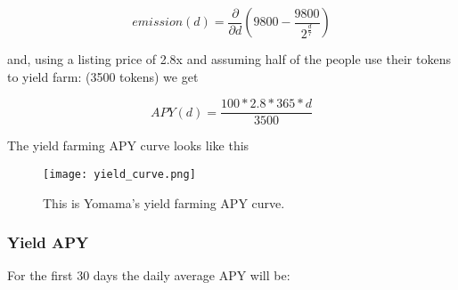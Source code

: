 \documentclass[11pt]{scrartcl} %
\begin{document}
\begin{equation} 
	\label{eq:yieldemission}
		emission(d)= 
		\frac{\partial}{{\partial d}} (9800-\frac{9800}{2^{\frac{d}{7}}})
\end{equation}

and, using a listing price of 2.8x and assuming half of the people use their tokens to yield farm: (3500 tokens) we get

\begin{equation} 
	\label{eq:yieldapy}
		APY(d)= 
		\frac{100*2.8*365*d}{3500}
\end{equation}

The yield farming APY curve looks like this

\begin{figure}[h] %
	\centering
	\texttt{[image: yield\_curve.png]} %
	\caption{This is Yomama's yield farming APY curve.}
\end{figure}

\clearpage

\subsubsection{Yield APY}

For the first 30 days the daily average APY will be:
\end{document}
